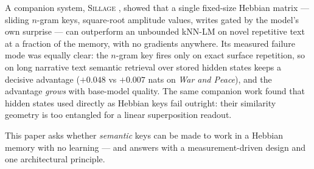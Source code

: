 \documentclass[11pt]{article}
\newcommand{\sillage}{\textsc{Sillage}}
\begin{document}
A companion system, \sillage{} \cite{sillage}, showed that a single fixed-size Hebbian matrix --- sliding $n$-gram keys, square-root amplitude values, writes gated by the model's own surprise --- can outperform an unbounded kNN-LM \cite{khandelwal2020} on novel repetitive text at a fraction of the memory, with no gradients anywhere. Its measured failure mode was equally clear: the $n$-gram key fires only on exact surface repetition, so on long narrative text semantic retrieval over stored hidden states keeps a decisive advantage ($+0.048$ vs $+0.007$ nats on \emph{War and Peace}), and the advantage \emph{grows} with base-model quality. The same companion work found that hidden states used directly as Hebbian keys fail outright: their similarity geometry is too entangled for a linear superposition readout.

This paper asks whether \emph{semantic} keys can be made to work in a Hebbian memory with no learning --- and answers with a measurement-driven design and one architectural principle.
\end{document}
